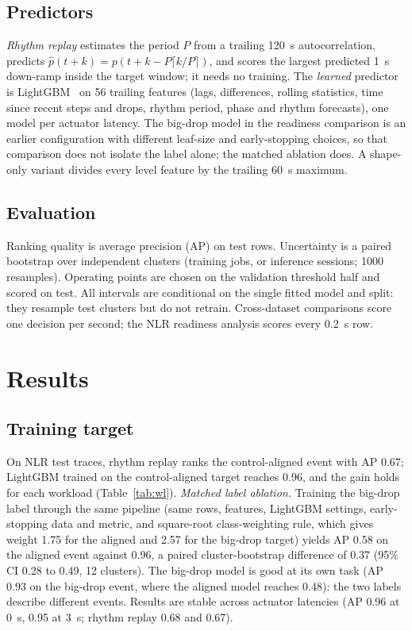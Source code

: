 \documentclass[conference]{IEEEtran}
\begin{document}
\subsection{Predictors}
\emph{Rhythm replay} estimates the period $P$ from a trailing 120~s autocorrelation, predicts
$\hat p(t+k)=p(t+k-P\lceil k/P\rceil)$, and scores the largest predicted 1~s down-ramp inside the
target window; it needs no training. The \emph{learned} predictor is LightGBM~\cite{lightgbm} on 56 trailing features
(lags, differences, rolling statistics, time since recent steps and drops, rhythm period, phase and
rhythm forecasts), one model per actuator latency. The big-drop model in the readiness comparison is an
earlier configuration with different leaf-size and early-stopping choices, so that comparison does not
isolate the label alone; the matched ablation does. A shape-only variant divides every level feature by
the trailing 60~s maximum.

\subsection{Evaluation}
Ranking quality is average precision (AP) on test rows. Uncertainty is a paired bootstrap over
independent clusters (training jobs, or inference sessions; 1000 resamples). Operating points are chosen
on the validation threshold half and scored on test. All intervals are conditional on the single fitted
model and split: they resample test clusters but do not retrain. Cross-dataset comparisons score one
decision per second; the NLR readiness analysis scores every 0.2~s row.

\section{Results}
\subsection{Training target}
On NLR test traces, rhythm replay ranks the control-aligned event with AP 0.67; LightGBM trained
on the control-aligned target reaches 0.96, and the gain holds for each workload (Table~\ref{tab:wl}).
\emph{Matched label ablation.} Training the big-drop label through the same pipeline (same rows, features,
LightGBM settings, early-stopping data and metric, and square-root class-weighting rule, which gives weight
1.75 for the aligned and 2.57 for the big-drop target) yields AP 0.58 on the aligned event
against 0.96, a paired cluster-bootstrap difference of 0.37 (95\% CI
0.28 to 0.49, 12 clusters). The big-drop model is good at its own task
(AP 0.93 on the big-drop event, where the aligned model reaches
0.48): the two labels describe different events.
Results are stable across actuator latencies (AP 0.96 at 0~s, 0.95
at 3~s; rhythm replay 0.68 and 0.67).
\end{document}
